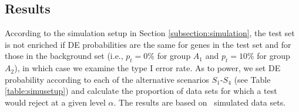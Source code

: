	
	
	
	
	\subsection{Results}\label{section:results}
	
	According to the simulation setup in Section \ref{subsection:simulation}, the test set is not
	enriched if DE probabilities are the same for genes in the test set and for those in the 
	background set (i.e., $p_t =0\%$ for group $A_1$ and $p_t = 10\%$ for group $A_2$), in which 
	case we	examine the type I error rate. As to power, we set DE probability according to each of 
	the alternative scenarios $S_1$-$S_4$ (see Table \ref{table:simusetup}) and calculate the 
	proportion of data sets for which a test would reject at a given level $\alpha$. The results 
	are based on \HowmanySimu~simulated data sets. 
	
